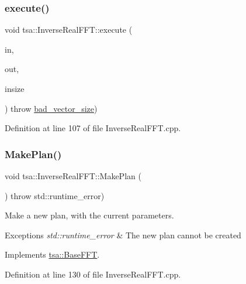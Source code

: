 \subsubsection{\texorpdfstring{execute()}{execute()}\hspace{0.1cm}{\footnotesize\ttfamily [4/4]}}
{\footnotesize\ttfamily void tsa\+::\+Inverse\+Real\+F\+F\+T\+::execute (\begin{DoxyParamCaption}\item[{\hyperlink{namespacetsa_ad294f56c16152a1618cbe2f19b768e2e}{Cmatrix\+Row} \&}]{in,  }\item[{\hyperlink{namespacetsa_aeaf3be962a114beef3d9e89b0fb49bf4}{Dmatrix\+Row} \&}]{out,  }\item[{unsigned int}]{insize }\end{DoxyParamCaption}) throw  \hyperlink{classtsa_1_1bad__vector__size}{bad\+\_\+vector\+\_\+size}) }



Definition at line 107 of file Inverse\+Real\+F\+F\+T.\+cpp.

\mbox{\label{classtsa_1_1_inverse_real_f_f_t_ae5b45701f989efce89c6c336ec78c189}} 
\subsubsection{\texorpdfstring{Make\+Plan()}{MakePlan()}}
{\footnotesize\ttfamily void tsa\+::\+Inverse\+Real\+F\+F\+T\+::\+Make\+Plan (\begin{DoxyParamCaption}{ }\end{DoxyParamCaption}) throw  std\+::runtime\+\_\+error) \hspace{0.3cm}{\ttfamily [virtual]}}

Make a new plan, with the current parameters.


\begin{DoxyExceptions}{Exceptions}
{\em std\+::runtime\+\_\+error} & The new plan cannot be created \\
\hline
\end{DoxyExceptions}


Implements \hyperlink{classtsa_1_1_base_f_f_t_a9af0c36413173821cac8dbdce9cfe3b4}{tsa\+::\+Base\+F\+FT}.



Definition at line 130 of file Inverse\+Real\+F\+F\+T.\+cpp.

